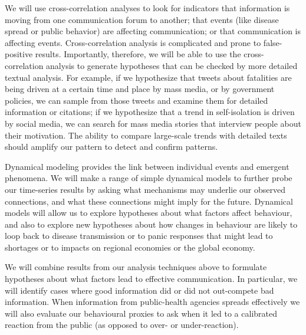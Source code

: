 We will use cross-correlation analyses to look for indicators that information is moving from one communication forum to another; that events (like disease spread or public behavior) are affecting communication; or that communication is affecting events. 
Cross-correlation analysis is complicated and prone to false-positive results. Importantly, therefore, we will be able to use the cross-correlation analysis to generate hypotheses that can be checked by more detailed textual analysis. For example, if we hypothesize that tweets about fatalities are being driven at a certain time and place by mass media, or by government policies, we can sample from those tweets and examine them for detailed information or citations; if we hypothesize that a trend in self-isolation is driven by social media, we can search for mass media stories that interview people about their motivation. The ability to compare large-scale trends with detailed texts should amplify our pattern to detect and confirm patterns.

 Dynamical modeling provides the link between individual events and emergent phenomena. We will make a range of simple dynamical models to further probe our time-series results by asking what mechanisms may underlie our observed connections, and what these connections might imply for the future. Dynamical models will allow us to explore hypotheses about what factors affect behaviour, and also to explore new hypotheses about how changes in behaviour are likely to loop back to disease transmission or to panic responses that might lead to shortages or to impacts on regional economies or the global economy.


We will combine results from our analysis techniques above to formulate hypotheses about what factors lead to effective communication. In particular, we will identify cases where good information did or did not out-compete bad information. When information from public-health agencies spreads effectively we will also evaluate our behavioural proxies to ask when it led to a calibrated reaction from the public (as opposed to over- or under-reaction).


